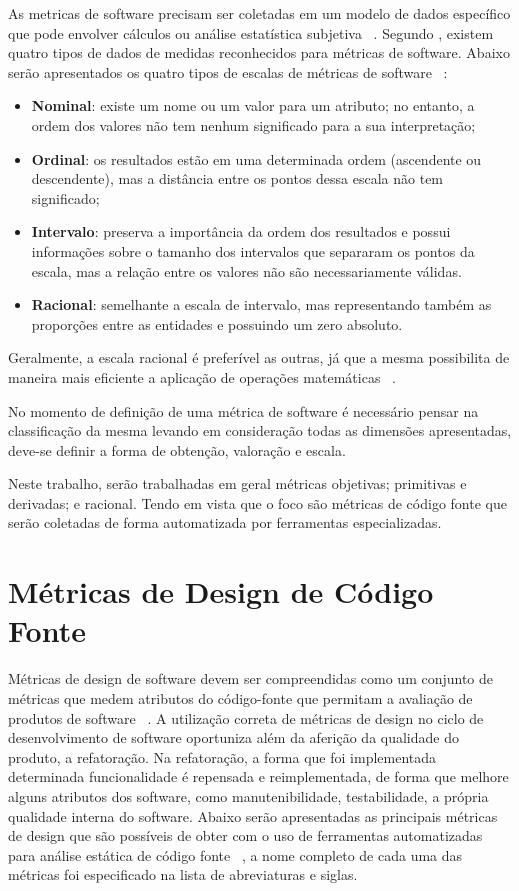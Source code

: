 As metricas de software precisam ser coletadas em um modelo de dados específico que pode envolver cálculos ou análise 
estatística subjetiva ~\cite{meirelles2013}. Segundo \cite{fenton&pfleenger98}, existem quatro tipos de dados de medidas
reconhecidos para métricas de software. Abaixo serão apresentados os quatro tipos de escalas de métricas de software 
~\cite{meirelles2013}:

\begin{itemize}
  \item \textbf{Nominal}: existe um nome ou um valor para um atributo; no entanto, a ordem dos valores não tem nenhum 
    significado para a sua interpretação;
  \item \textbf{Ordinal}: os resultados estão em uma determinada ordem (ascendente ou descendente), mas a distância entre os 
    pontos dessa escala não tem significado;
  \item \textbf{Intervalo}: preserva a importância da ordem dos resultados e possui informações sobre o tamanho dos intervalos
    que separaram os pontos da escala, mas a relação entre os valores não são necessariamente válidas.
  \item \textbf{Racional}: semelhante a escala de intervalo, mas representando também as proporções entre as entidades e
    possuindo um zero absoluto. 
\end{itemize}

Geralmente, a escala racional é preferível as outras, já que a mesma possibilita de maneira mais eficiente a aplicação de 
operações matemáticas ~\cite{meirelles2013}.

No momento de definição de uma métrica de software é necessário pensar na classificação da mesma levando em consideração
todas as dimensões apresentadas, deve-se definir a forma de obtenção, valoração e escala.

Neste trabalho, serão trabalhadas em geral métricas objetivas; primitivas e derivadas; e racional. Tendo em vista que o 
foco são métricas de código fonte que serão coletadas de forma automatizada por ferramentas especializadas.

\section{Métricas de Design de Código Fonte}

Métricas de design de software devem ser compreendidas como um conjunto de métricas que medem atributos do código-fonte que 
permitam a avaliação de produtos de software ~\cite{arthur&carlos2014}. A utilização correta de métricas de design no ciclo
de desenvolvimento de software oportuniza além da aferição da qualidade do produto, a refatoração. Na refatoração, a forma que
foi implementada determinada funcionalidade é repensada e reimplementada, de forma que melhore alguns atributos dos software,
como manutenibilidade, testabilidade, a própria qualidade interna do software. Abaixo serão apresentadas as principais métricas
de design que são possíveis de obter com o uso de ferramentas automatizadas para análise estática de código fonte 
~\cite{arthur&carlos2014,meirelles2013}, a nome completo de cada uma das métricas foi especificado na lista de abreviaturas e 
siglas.

